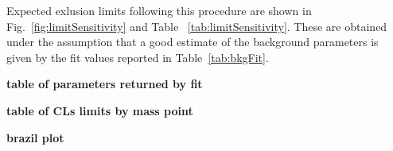Expected exlusion limits following this procedure are shown in Fig.~\ref{fig:limitSensitivity} and Table
~\ref{tab:limitSensitivity}. These are obtained under the assumption that
 a good estimate of the background parameters is given by the fit values reported in Table~\ref{tab:bkgFit}. 

\textbf{table of parameters returned by fit}

\textbf{table of CLs limits by mass point}

\textbf{brazil plot}

